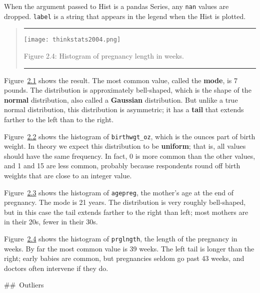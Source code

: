 \documentclass[]{book}
\begin{document}
When the argument passed to Hist is a pandas Series, any \texttt{nan} values
are dropped. \texttt{label} is a
string that appears in the legend when the Hist is plotted.

\begin{quote}
\begin{center}\rule{0.5\linewidth}{\linethickness}\end{center}

\texttt{[image: thinkstats2004.png]}

Figure 2.4: Histogram of pregnancy length in weeks.

\protect\hypertarget{first_prglngth_hist}{}{}

\begin{center}\rule{0.5\linewidth}{\linethickness}\end{center}
\end{quote}

Figure~\protect\hyperlink{first_wgt_lb_hist}{2.1} shows the result. The most common value,
called the \textbf{mode}, is 7 pounds. The
distribution is approximately bell-shaped, which is the shape of the
\textbf{normal} distribution, also called a \textbf{Gaussian} distribution. But unlike
a true normal distribution, this distribution is asymmetric; it has a \textbf{tail} that extends farther to the
left than to the right.

Figure~\protect\hyperlink{first_wgt_oz_hist}{2.2} shows the histogram of \texttt{birthwgt\_oz}, which is
the ounces part of birth weight. In theory we expect this distribution
to be \textbf{uniform}; that is, all values
should have the same frequency. In fact, 0 is more common than the other
values, and 1 and 15 are less common, probably because respondents round
off birth weights that are close to an integer value.

Figure~\protect\hyperlink{first_agepreg_hist}{2.3} shows the histogram of \texttt{agepreg}, the mother's
age at the end of pregnancy. The mode is 21 years. The distribution is
very roughly bell-shaped, but in this case the tail extends farther to
the right than left; most mothers are in their 20s, fewer in their
30s.

Figure~\protect\hyperlink{first_prglngth_hist}{2.4} shows the histogram of \texttt{prglngth}, the length
of the pregnancy in weeks. By far the most common value is 39 weeks. The
left tail is longer than the right; early babies are common, but
pregnancies seldom go past 43 weeks, and doctors often intervene if they
do.

\#\#~Outliers
\end{document}

